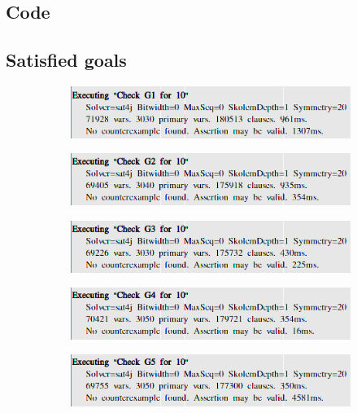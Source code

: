 \documentclass{article}
\begin{document}
	\subsection{Code}
	
	\subsection{Satisfied goals}
	\label{Alloy:Goals}
	\begin{figure}[H]
		\begin{subfigure}[H]{\linewidth}
			\includegraphics[width=\linewidth]{Images/Alloy_G1.png}
		\end{subfigure}
		\begin{subfigure}[H]{\linewidth}
			\includegraphics[width=\linewidth]{Images/Alloy_G2.png}
		\end{subfigure}
		\begin{subfigure}[H]{\linewidth}
			\includegraphics[width=\linewidth]{Images/Alloy_G3.png}
		\end{subfigure}
		\begin{subfigure}[H]{\linewidth}
			\includegraphics[width=\linewidth]{Images/Alloy_G4.png}
		\end{subfigure}
		\begin{subfigure}[H]{\linewidth}
			\includegraphics[width=\linewidth]{Images/Alloy_G5.png}

\end{subfigure}
\end{figure}
\end{document}
